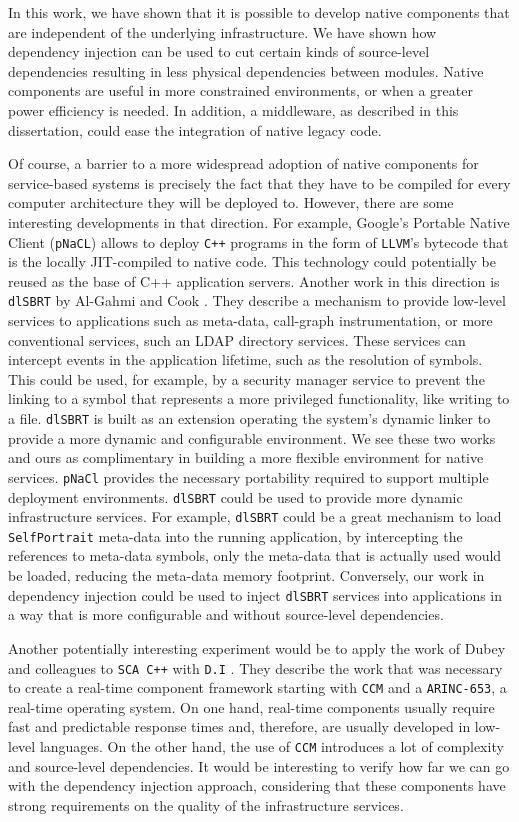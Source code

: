 In this work, we have shown that it is possible to develop native components that are independent of the
underlying infrastructure. We have shown how dependency injection can be used to cut certain kinds
of source-level dependencies resulting in less physical dependencies between modules. Native components
are useful in more constrained environments, or when a greater power efficiency is needed. In addition,
a middleware, as described in this dissertation, could ease the integration of native legacy code.

Of course, a barrier to a more widespread adoption of native components for service-based systems is precisely
the fact that they have to be compiled for every computer architecture they will be deployed to. However,
there are some interesting developments in that direction. For example, Google's Portable Native Client (\texttt{pNaCL}) \cite{pNaCl}
allows to deploy \texttt{C++} programs in the form of \texttt{LLVM}'s bytecode that is the locally JIT-compiled to native code.
This technology could potentially be reused as the base of C++ application servers. Another work in this
direction is \texttt{dlSBRT} by Al-Gahmi and Cook \cite{Al-Gahmi}. They describe a mechanism to provide low-level services
to applications such as meta-data, call-graph instrumentation, or more conventional services, such an LDAP
directory services. These services can intercept events in the application lifetime, such as the resolution of
symbols. This could be used, for example, by a security manager service to prevent the linking to a symbol
that represents a more privileged functionality, like writing to a file. \texttt{dlSBRT} is built as an extension
operating the system's dynamic linker to provide a more dynamic and configurable environment.
We see these two works and ours as complimentary in building a more flexible environment for native services.
\texttt{pNaCl} provides the necessary portability required to support multiple deployment environments. \texttt{dlSBRT} could
be used to provide more dynamic infrastructure services. For example, \texttt{dlSBRT} could be a great mechanism to load
\texttt{SelfPortrait} meta-data into the running application, by intercepting the references to meta-data symbols, only
the meta-data that is actually used would be loaded, reducing the meta-data memory footprint. Conversely, our
work in dependency injection could be used to inject \texttt{dlSBRT} services into applications in a way that is more
configurable and without source-level dependencies.

Another potentially interesting experiment would be to apply the work of Dubey and colleagues to \texttt{SCA C++} with \texttt{D.I} \cite{Dubey}.
They describe the work that was necessary to create a real-time component framework starting with \texttt{CCM} and a \texttt{ARINC-653},
a real-time operating system. On one hand, real-time components usually require fast and predictable response times and, therefore,
are usually developed in low-level languages. On the other hand, the use of \texttt{CCM} introduces a lot of complexity and source-level
dependencies. It would be interesting to verify how far we can go with the dependency injection approach, considering
that these components have strong requirements on the quality of the infrastructure services.


